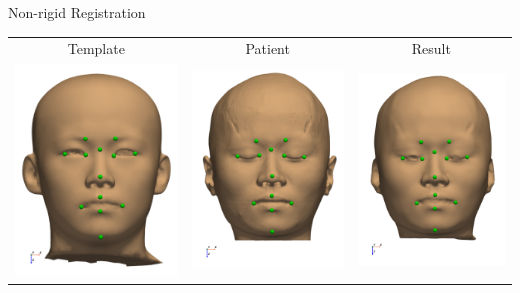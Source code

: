 \documentclass{beamer}
\begin{document}
\begin{frame}{Non-rigid Registration}
  \begin{table}
    \centering
    \begin{tabular}{ccc}
      Template                                                              & Patient                                                               & Result                                                                \\
      \includegraphics[height = 0.29 \linewidth]{fig/source-face-front.pdf} & \includegraphics[height = 0.29 \linewidth]{fig/target-face-front.pdf} & \includegraphics[height = 0.29 \linewidth]{fig/result-face-front.pdf} \\

\end{tabular}
\end{table}
\end{frame}
\end{document}
